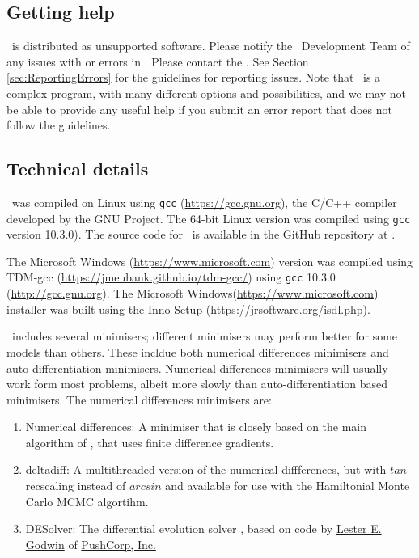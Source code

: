 \subsection{Getting help}

\CNAME\ is distributed as unsupported software. Please notify the \CNAME\ Development Team of any issues with or errors in \CNAME. Please contact the \emaillink. See Section \ref{sec:ReportingErrors} for the guidelines for reporting issues. Note that \CNAME\ is a complex program, with many different options and possibilities, and we may not be able to provide any useful help if you submit an error report that does not follow the guidelines.

\subsection{Technical details}\label{sec:TechnicalDetails}

\CNAME\ was compiled on Linux using \texttt{gcc} (\url{https://gcc.gnu.org}), the C/C++ compiler developed by the GNU Project. The 64-bit Linux  version was compiled using \texttt{gcc} version 10.3.0). The source code for \CNAME\ is available in the GitHub repository at \github.

The Microsoft Windows (\url{https://www.microsoft.com}) version was compiled using TDM-gcc (\url{https://jmeubank.github.io/tdm-gcc/}) using \texttt{gcc} 10.3.0 (\url{http://gcc.gnu.org}). The Microsoft Windows(\url{https://www.microsoft.com}) installer was built using the Inno Setup (\url{https://jrsoftware.org/isdl.php}).

\CNAME\ includes several minimisers; different minimisers may perform better for some models than others. These incldue both numerical differences minimisers and auto-differentiation minimisers. Numerical differences minimisers will usually work form most problems, albeit more slowly than auto-differentiation based minimisers. The numerical differences minimisers are:

\begin{enumerate}
\item Numerical differences: A minimiser that is closely based on the main algorithm of \cite{779}, that uses finite difference gradients.
\item deltadiff: A multithreaded version of the numerical diffferences, but with $tan$ recscaling instead of $arcsin$ and available for use with the Hamiltonial Monte Carlo MCMC algortihm.
\item DESolver: The differential evolution solver \citep{1442}, based on code by \href{mailto:<godwin@pushcorp.com>}{Lester E. Godwin} of \href{http://www.pushcorp.com}{PushCorp, Inc.}
\end{enumerate}

